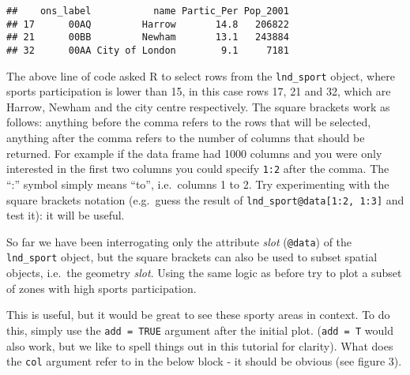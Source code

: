 \documentclass[]{article}
\newenvironment{Shaded}{}{}
\newcommand{\KeywordTok}[1]{\textcolor[rgb]{0.00,0.44,0.13}{\textbf{{#1}}}}
\newcommand{\DecValTok}[1]{\textcolor[rgb]{0.25,0.63,0.44}{{#1}}}
\newcommand{\StringTok}[1]{\textcolor[rgb]{0.25,0.44,0.63}{{#1}}}
\newcommand{\CommentTok}[1]{\textcolor[rgb]{0.38,0.63,0.69}{\textit{{#1}}}}
\newcommand{\NormalTok}[1]{{#1}}
\begin{document}
\begin{Shaded}
\end{Shaded}

\begin{verbatim}
##    ons_label           name Partic_Per Pop_2001
## 17      00AQ         Harrow       14.8   206822
## 21      00BB         Newham       13.1   243884
## 32      00AA City of London        9.1     7181
\end{verbatim}

The above line of code asked R to select rows from the
\texttt{lnd\_sport} object, where sports participation is lower than 15,
in this case rows 17, 21 and 32, which are Harrow, Newham and the city
centre respectively. The square brackets work as follows: anything
before the comma refers to the rows that will be selected, anything
after the comma refers to the number of columns that should be returned.
For example if the data frame had 1000 columns and you were only
interested in the first two columns you could specify \texttt{1:2} after
the comma. The ``:'' symbol simply means ``to'', i.e.~columns 1 to 2.
Try experimenting with the square brackets notation (e.g.~guess the
result of \texttt{lnd\_sport@data{[}1:2, 1:3{]}} and test it): it will
be useful.

So far we have been interrogating only the attribute \emph{slot}
(\texttt{@data}) of the \texttt{lnd\_sport} object, but the square
brackets can also be used to subset spatial objects, i.e.~the geometry
\emph{slot}. Using the same logic as before try to plot a subset of
zones with high sports participation.

\begin{Shaded}
\end{Shaded}

This is useful, but it would be great to see these sporty areas in
context. To do this, simply use the \texttt{add = TRUE} argument after
the initial plot. (\texttt{add = T} would also work, but we like to
spell things out in this tutorial for clarity). What does the
\texttt{col} argument refer to in the below block - it should be obvious
(see figure 3).
\end{document}
